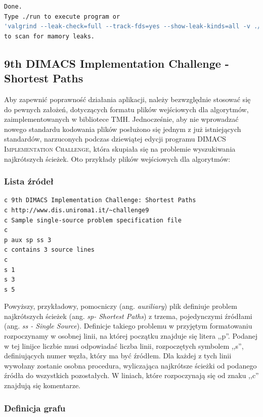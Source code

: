 \small
\begin{lstlisting}[language=bash]
Done.
Type ./run to execute program or 
'valgrind --leak-check=full --track-fds=yes --show-leak-kinds=all -v ./run' 
to scan for mamory leaks.
\end{lstlisting}
\normalsize

\subsection{9th DIMACS Implementation Challenge - Shortest Paths}

Aby zapewnić poprawność działania aplikacji, należy bezwzględnie stosować się do pewnych założeń, dotyczących formatu plików wejściowych dla algorytmów, zaimplementowanych w bibliotece \textsc{TMH}. Jednocześnie, aby nie wprowadzać nowego standardu kodowania plików posłużono się jednym z już istniejących standardów, narzuconych podczas dziewiątej edycji programu \textsc{DIMACS Implementation Challenge}, która skupiała się na problemie wyszukiwania najkrótszych ścieżek. Oto przykłady plików wejściowych dla algorytmów:

\subsubsection{Lista źródeł}
\label{sub:fileWithSourceList}

\small
\begin{lstlisting}[language=bash]
c 9th DIMACS Implementation Challenge: Shortest Paths
c http://www.dis.uniroma1.it/~challenge9
c Sample single-source problem specification file
c
p aux sp ss 3
c contains 3 source lines
c
s 1
s 3
s 5

\end{lstlisting}
\normalsize

Powyższy, przykładowy, pomocniczy (ang. \textit{auxiliary}) plik definiuje problem najkrótszych ścieżek (ang. \textit{sp- Shortest Paths}) z trzema, pojedynczymi źródłami (ang. \textit{ss - Single Source}). Definicje takiego problemu w przyjętym formatowaniu rozpoczynamy w osobnej linii, na której początku znajduje się litera ,,p''. Podanej w tej linijce liczbie musi odpowiadać liczba linii, rozpoczętych symbolem ,,s'', definiujących numer węzła, który ma być źródłem. Dla każdej z tych linii wywołany zostanie osobna procedura, wyliczająca najkrótsze ścieżki od podanego źródła do wszystkich pozostałych. W liniach, które rozpoczynają się od znaku ,,c'' znajdują się komentarze.

\subsubsection{Definicja grafu}

